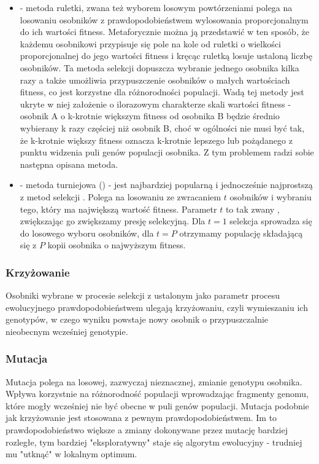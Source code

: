 \begin{itemize}

\item {} - metoda ruletki, zwana też wyborem losowym powtórzeniami  polega na losowaniu osobników z prawdopodobieństwem wylosowania proporcjonalnym do ich wartości fitness. Metaforycznie można ją przedstawić w ten sposób, że każdemu osobnikowi przypisuje się pole na kole od ruletki o wielkości proporcjonalnej do jego wartości fitness i kręcąc ruletką losuje ustaloną liczbę osobników. 
Ta metoda selekcji dopuszcza wybranie jednego osobnika kilka razy a także umożliwia przypuszczenie osobników o małych wartościach fitness, co jest korzystne dla różnorodności populacji. Wadą tej metody jest ukryte w niej założenie o ilorazowym charakterze skali wartości fitness - osobnik A o k-krotnie większym fitness od osobnika B będzie średnio wybierany k razy częściej niż osobnik B, choć w ogólności nie musi być tak, że k-krotnie większy fitness oznacza k-krotnie lepszego lub pożądanego z punktu widzenia puli genów populacji osobnika. Z tym problemem radzi sobie następna opisana metoda.

\item {} - metoda turniejowa () - jest najbardziej popularną i jednocześnie najprostszą z metod selekcji \cite{Luke2009Metaheuristics}. Polega na losowaniu ze zwracaniem $ t $ osobników i wybraniu tego, który ma największą wartość fitness. Parametr $ t $ to tak zwany , zwiększając go zwiększamy presję selekcyjną. Dla $ t = 1 $ selekcja sprowadza się do losowego wyboru osobników, dla $ t = P $ otrzymamy populację składającą się z $ P $ kopii osobnika o najwyższym fitness.	

\end{itemize}


\subsubsection{Krzyżowanie}
Osobniki wybrane w procesie selekcji z ustalonym jako parametr procesu ewolucyjnego prawdopodobieństwem ulegają krzyżowaniu, czyli wymieszaniu ich genotypów, w czego wyniku powstaje nowy osobnik o przypuszczalnie nieobecnym wcześniej genotypie.

\subsubsection{Mutacja}
Mutacja polega na losowej, zazwyczaj nieznacznej, zmianie genotypu osobnika. Wpływa korzystnie na różnorodność populacji wprowadzając fragmenty genomu, które mogły wcześniej nie być obecne w puli genów populacji. Mutacja podobnie jak krzyżowanie jest stosowana z pewnym prawdopodobieństwem. Im to prawdopodobieństwo większe a zmiany dokonywane przez mutację bardziej rozległe, tym bardziej "eksploratywny" staje się algorytm ewolucyjny - trudniej mu "utknąć" w lokalnym optimum.

